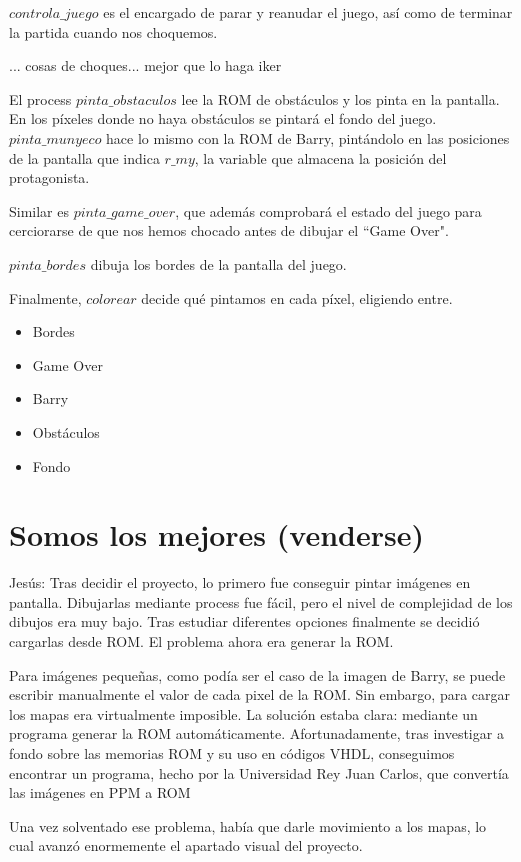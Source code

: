 \documentclass[11pt, a4paper, spanish, openright, twoside]{book}
\begin{document}
$controla\_juego$ es el encargado de parar y reanudar el juego, así como de terminar la partida cuando nos choquemos.

... cosas de choques... mejor que lo haga iker

El process $pinta\_obstaculos$ lee la ROM de obstáculos y los pinta en la pantalla. En los píxeles donde no haya obstáculos se pintará el fondo del juego. $pinta\_munyeco$ hace lo mismo con la ROM de Barry, pintándolo en las posiciones de la pantalla que indica $r\_my$, la variable que almacena la posición del protagonista.

Similar es $pinta\_game\_over$, que además comprobará el estado del juego para cerciorarse de que nos hemos chocado antes de dibujar el ``Game Over".

$pinta\_bordes$ dibuja los bordes de la pantalla del juego.

Finalmente, $colorear$ decide qué pintamos en cada píxel, eligiendo entre.
\begin{itemize}
\item Bordes
\item Game Over
\item Barry
\item Obstáculos
\item Fondo
\end{itemize}

\section{Somos los mejores (venderse)}
Jesús:  Tras decidir el proyecto, lo primero fue conseguir pintar imágenes en pantalla. Dibujarlas mediante process fue fácil, pero el nivel de complejidad de los dibujos era muy bajo. Tras estudiar diferentes opciones finalmente se decidió cargarlas desde ROM.
El problema ahora era generar la ROM.

Para imágenes pequeñas, como podía ser el caso de la imagen de Barry, se puede escribir manualmente el valor de cada pixel de la ROM. Sin embargo, para cargar los mapas era virtualmente imposible. La solución estaba clara: mediante un programa generar la ROM automáticamente. Afortunadamente, tras investigar a fondo sobre las memorias ROM y su uso en códigos VHDL, conseguimos encontrar un programa, hecho por la Universidad Rey Juan Carlos, que convertía las imágenes en PPM a ROM

Una vez solventado ese problema, había que darle movimiento a los mapas, lo cual avanzó enormemente el apartado visual del proyecto.
\end{document}
